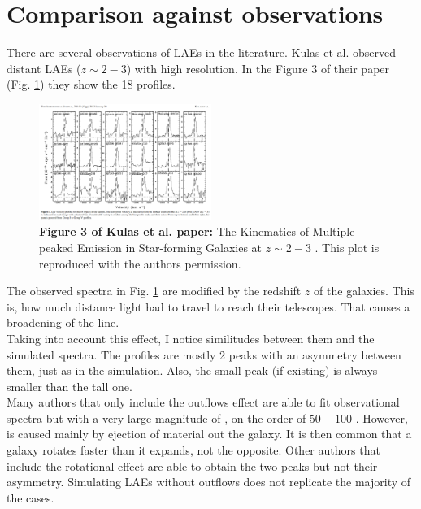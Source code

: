 \documentclass[twocolappendix]{latex/emulateapj}
\begin{document}
\section{Comparison against observations}
\label{sec:comparisonobservations}

There are several observations of LAEs in the literature. Kulas et al. \cite{Kulas12} observed distant LAEs ($z\sim2-3$) with high resolution. In the Figure 3 of their paper (Fig. \ref{fig:kulas}) they show the 18 \lya profiles. \\

\begin{figure}[h!]
	\begin{center}
		\includegraphics[width=0.5\textwidth]{./figures/figure3_kulas}
	\end{center}
	\caption{\textbf{Figure 3 of Kulas et al. paper:} The Kinematics of Multiple-peaked \lya Emission in Star-forming Galaxies at $z\sim2-3$ \cite{Kulas12}. This plot is reproduced with the authors permission.
		\label{fig:kulas}}
\end{figure}

The observed spectra in Fig. \ref{fig:kulas} are modified by the redshift $z$ of the galaxies. This is, how much distance light had to travel to reach their telescopes. That causes a broadening of the line. \\

Taking into account this effect, I notice similitudes between them and the simulated spectra. The \lya profiles are mostly 2 peaks with an asymmetry between them, just as in the simulation. Also, the small peak (if existing) is always smaller than the tall one.\\

Many authors that only include the outflows effect are able to fit observational spectra but with a very large magnitude of \vout, on the order of $50-100$ \kms. However, \vout is caused mainly by ejection of material out the galaxy. It is then common that a galaxy rotates faster than it expands, not the opposite. Other authors that include the rotational effect are able to obtain the two peaks but not their asymmetry. Simulating LAEs without outflows does not replicate the majority of the cases. \\
\end{document}
